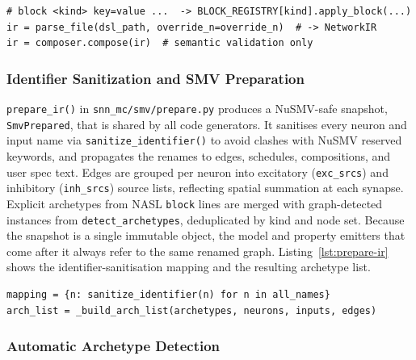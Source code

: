 \documentclass[
]{ceurart}
\begin{document}
\begin{lstlisting}[style=pythoncode,caption={Parser entry point and block expansion.},label=lst:dsl-syntax]
# block <kind> key=value ...  -> BLOCK_REGISTRY[kind].apply_block(...)
ir = parse_file(dsl_path, override_n=override_n)  # -> NetworkIR
ir = composer.compose(ir)  # semantic validation only
\end{lstlisting}

\subsubsection{Identifier Sanitization and SMV Preparation}

\texttt{prepare\_ir()} in \texttt{snn\_mc/smv/prepare.py} produces a
NuSMV-safe snapshot, \texttt{SmvPrepared}, that is shared by all code
generators. It sanitises every neuron and input name via
\texttt{sanitize\_identifier()} to avoid clashes with NuSMV reserved
keywords, and propagates the renames to edges, schedules, compositions,
and user spec text. Edges are grouped per neuron into excitatory
(\texttt{exc\_srcs}) and inhibitory (\texttt{inh\_srcs}) source lists,
reflecting spatial summation at each synapse. Explicit archetypes from
\textsc{NASL} \texttt{block} lines are merged with graph-detected
instances from \texttt{detect\_archetypes}, deduplicated by kind and node
set. Because the snapshot is a single immutable object, the model and
property emitters that come after it always refer to the same renamed
graph. Listing~\ref{lst:prepare-ir} shows the identifier-sanitisation
mapping and the resulting archetype list.

\begin{lstlisting}[style=pythoncode,caption={Preparation: sanitisation and archetype merge.},label=lst:prepare-ir]
mapping = {n: sanitize_identifier(n) for n in all_names}
arch_list = _build_arch_list(archetypes, neurons, inputs, edges)
\end{lstlisting}

\subsubsection{Automatic Archetype Detection}
\end{document}

